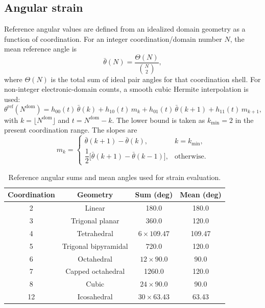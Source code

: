 \documentclass[journal=jctcce,manuscript=article]{achemso}
\begin{document}
\subsection{Angular strain}
Reference angular values are defined from an idealized domain geometry as a function of coordination.
For an integer coordination/domain number $N$, the mean reference angle is
\begin{equation}
\bar{\theta}(N)=\frac{\Theta(N)}{\binom{N}{2}},
\end{equation}
where $\Theta(N)$ is the total sum of ideal pair angles for that coordination shell.
For non-integer electronic-domain counts, a smooth cubic Hermite interpolation is used:
\begin{equation}
\theta^{\mathrm{ref}}(N^{\mathrm{dom}})=
h_{00}(t)\,\bar{\theta}(k)+
h_{10}(t)\,m_k+
h_{01}(t)\,\bar{\theta}(k+1)+
h_{11}(t)\,m_{k+1},
\end{equation}
with $k=\lfloor N^{\mathrm{dom}}\rfloor$ and $t=N^{\mathrm{dom}}-k$.
The lower bound is taken as $k_{\min}=2$ in the present coordination range.
The slopes are
\begin{equation}
m_k=
\begin{cases}
\bar{\theta}(k+1)-\bar{\theta}(k), & k=k_{\min},\\[4pt]
\dfrac{1}{2}\big[\bar{\theta}(k+1)-\bar{\theta}(k-1)\big], & \text{otherwise}.
\end{cases}
\end{equation}

\begin{table}[ht]
\caption{Reference angular sums and mean angles used for strain evaluation.}
\label{tab:ref_angles}
\centering
\begin{tabular}{cccc}
\toprule
Coordination & Geometry & Sum (deg) & Mean (deg) \\
\midrule
2  & Linear               & 180.0             & 180.0 \\
3  & Trigonal planar      & 360.0             & 120.0 \\
4  & Tetrahedral          & $6 \times 109.47$ & 109.47 \\
5  & Trigonal bipyramidal & 720.0             & 120.0 \\
6  & Octahedral           & $12 \times 90.0$  & 90.0  \\
7  & Capped octahedral    & 1260.0            & 120.0 \\
8  & Cubic                & $24 \times 90.0$  & 90.0  \\
12 & Icosahedral          & $30 \times 63.43$ & 63.43 \\
\bottomrule
\end{tabular}
\end{table}
\end{document}
